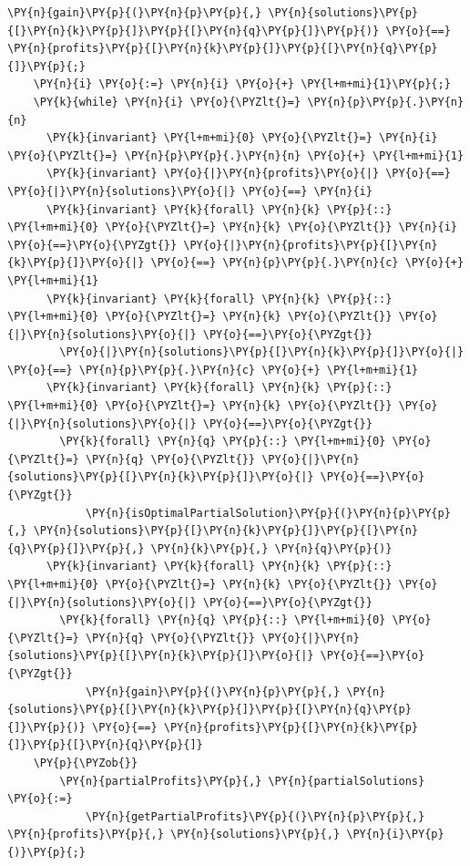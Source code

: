 \begin{sloppypar}
\begin{Verbatim}[commandchars=\\\{\}]
            \PY{n}{gain}\PY{p}{(}\PY{n}{p}\PY{p}{,} \PY{n}{solutions}\PY{p}{[}\PY{n}{k}\PY{p}{]}\PY{p}{[}\PY{n}{q}\PY{p}{]}\PY{p}{)} \PY{o}{==} \PY{n}{profits}\PY{p}{[}\PY{n}{k}\PY{p}{]}\PY{p}{[}\PY{n}{q}\PY{p}{]}\PY{p}{;}
    \PY{n}{i} \PY{o}{:=} \PY{n}{i} \PY{o}{+} \PY{l+m+mi}{1}\PY{p}{;}
    \PY{k}{while} \PY{n}{i} \PY{o}{\PYZlt{}=} \PY{n}{p}\PY{p}{.}\PY{n}{n} 
      \PY{k}{invariant} \PY{l+m+mi}{0} \PY{o}{\PYZlt{}=} \PY{n}{i} \PY{o}{\PYZlt{}=} \PY{n}{p}\PY{p}{.}\PY{n}{n} \PY{o}{+} \PY{l+m+mi}{1}
      \PY{k}{invariant} \PY{o}{|}\PY{n}{profits}\PY{o}{|} \PY{o}{==} \PY{o}{|}\PY{n}{solutions}\PY{o}{|} \PY{o}{==} \PY{n}{i}
      \PY{k}{invariant} \PY{k}{forall} \PY{n}{k} \PY{p}{::} \PY{l+m+mi}{0} \PY{o}{\PYZlt{}=} \PY{n}{k} \PY{o}{\PYZlt{}} \PY{n}{i} \PY{o}{==}\PY{o}{\PYZgt{}} \PY{o}{|}\PY{n}{profits}\PY{p}{[}\PY{n}{k}\PY{p}{]}\PY{o}{|} \PY{o}{==} \PY{n}{p}\PY{p}{.}\PY{n}{c} \PY{o}{+} \PY{l+m+mi}{1}
      \PY{k}{invariant} \PY{k}{forall} \PY{n}{k} \PY{p}{::} \PY{l+m+mi}{0} \PY{o}{\PYZlt{}=} \PY{n}{k} \PY{o}{\PYZlt{}} \PY{o}{|}\PY{n}{solutions}\PY{o}{|} \PY{o}{==}\PY{o}{\PYZgt{}} 
        \PY{o}{|}\PY{n}{solutions}\PY{p}{[}\PY{n}{k}\PY{p}{]}\PY{o}{|} \PY{o}{==} \PY{n}{p}\PY{p}{.}\PY{n}{c} \PY{o}{+} \PY{l+m+mi}{1}
      \PY{k}{invariant} \PY{k}{forall} \PY{n}{k} \PY{p}{::} \PY{l+m+mi}{0} \PY{o}{\PYZlt{}=} \PY{n}{k} \PY{o}{\PYZlt{}} \PY{o}{|}\PY{n}{solutions}\PY{o}{|} \PY{o}{==}\PY{o}{\PYZgt{}} 
        \PY{k}{forall} \PY{n}{q} \PY{p}{::} \PY{l+m+mi}{0} \PY{o}{\PYZlt{}=} \PY{n}{q} \PY{o}{\PYZlt{}} \PY{o}{|}\PY{n}{solutions}\PY{p}{[}\PY{n}{k}\PY{p}{]}\PY{o}{|} \PY{o}{==}\PY{o}{\PYZgt{}} 
            \PY{n}{isOptimalPartialSolution}\PY{p}{(}\PY{n}{p}\PY{p}{,} \PY{n}{solutions}\PY{p}{[}\PY{n}{k}\PY{p}{]}\PY{p}{[}\PY{n}{q}\PY{p}{]}\PY{p}{,} \PY{n}{k}\PY{p}{,} \PY{n}{q}\PY{p}{)}
      \PY{k}{invariant} \PY{k}{forall} \PY{n}{k} \PY{p}{::} \PY{l+m+mi}{0} \PY{o}{\PYZlt{}=} \PY{n}{k} \PY{o}{\PYZlt{}} \PY{o}{|}\PY{n}{solutions}\PY{o}{|} \PY{o}{==}\PY{o}{\PYZgt{}} 
        \PY{k}{forall} \PY{n}{q} \PY{p}{::} \PY{l+m+mi}{0} \PY{o}{\PYZlt{}=} \PY{n}{q} \PY{o}{\PYZlt{}} \PY{o}{|}\PY{n}{solutions}\PY{p}{[}\PY{n}{k}\PY{p}{]}\PY{o}{|} \PY{o}{==}\PY{o}{\PYZgt{}} 
            \PY{n}{gain}\PY{p}{(}\PY{n}{p}\PY{p}{,} \PY{n}{solutions}\PY{p}{[}\PY{n}{k}\PY{p}{]}\PY{p}{[}\PY{n}{q}\PY{p}{]}\PY{p}{)} \PY{o}{==} \PY{n}{profits}\PY{p}{[}\PY{n}{k}\PY{p}{]}\PY{p}{[}\PY{n}{q}\PY{p}{]}
    \PY{p}{\PYZob{}}
        \PY{n}{partialProfits}\PY{p}{,} \PY{n}{partialSolutions} \PY{o}{:=} 
            \PY{n}{getPartialProfits}\PY{p}{(}\PY{n}{p}\PY{p}{,} \PY{n}{profits}\PY{p}{,} \PY{n}{solutions}\PY{p}{,} \PY{n}{i}\PY{p}{)}\PY{p}{;}

\end{Verbatim}
\end{sloppypar}

